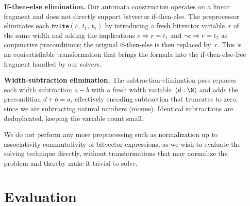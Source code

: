 \noindent\textbf{If-then-else elimination.}
Our automata construction operates on a linear fragment and does not
directly support bitvector if-then-else.
The preprocessor eliminates each $\texttt{bvIte}(c,\, t_1,\, t_2)$
by introducing a fresh bitvector variable~$r$ of the same width
and adding the implications
$c \Rightarrow r = t_1$ and $\lnot c \Rightarrow r = t_2$
as conjunctive preconditions; the original if-then-else is then replaced by~$r$.
This is an equisatisfiable transformation that brings the formula
into the if-then-else-free fragment handled by our solvers.

\noindent\textbf{Width-subtraction elimination.}
The subtraction-elimination pass replaces each width subtraction $a - b$
with a fresh width variable~$(d : \N)$ and adds the precondition $d + b = a$,
effectively encoding subtraction that truncates to zero, since we are subtracting natural numbers (monus).
Identical subtractions are deduplicated, keeping the variable count small.

We do not perform any more preprocessing such as normalization up to associativity-commutativity of bitvector expressions,
as we wish to evaluate the solving technique directly, without transformations that may normalize the problem and thereby make it trivial to solve.

\section{Evaluation}
\label{sec:mwbv:evaluation}


